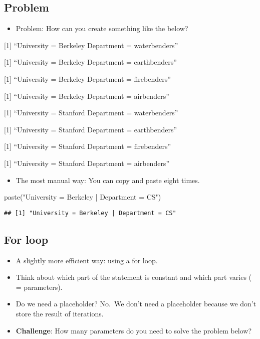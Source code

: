 \documentclass[
]{book}
\newenvironment{Shaded}{\begin{snugshade}}{\end{snugshade}}
\newcommand{\FunctionTok}[1]{\textcolor[rgb]{0.00,0.00,0.00}{#1}}
\newcommand{\NormalTok}[1]{#1}
\newcommand{\StringTok}[1]{\textcolor[rgb]{0.31,0.60,0.02}{#1}}
\providecommand{\tightlist}{%
  \setlength{\itemsep}{0pt}\setlength{\parskip}{0pt}}
\begin{document}
\hypertarget{problem}{%
\subsection{Problem}\label{problem}}

\begin{itemize}
\tightlist
\item
  Problem: How can you create something like the below?
\end{itemize}

{[}1{]} ``University = Berkeley \textbar{} Department = waterbenders''

{[}1{]} ``University = Berkeley \textbar{} Department = earthbenders''

{[}1{]} ``University = Berkeley \textbar{} Department = firebenders''

{[}1{]} ``University = Berkeley \textbar{} Department = airbenders''

{[}1{]} ``University = Stanford \textbar{} Department = waterbenders''

{[}1{]} ``University = Stanford \textbar{} Department = earthbenders''

{[}1{]} ``University = Stanford \textbar{} Department = firebenders''

{[}1{]} ``University = Stanford \textbar{} Department = airbenders''

\begin{itemize}
\tightlist
\item
  The most manual way: You can copy and paste eight times.
\end{itemize}

\begin{Shaded}
\begin{Highlighting}[]
\FunctionTok{paste}\NormalTok{(}\StringTok{"University = Berkeley | Department = CS"}\NormalTok{)}
\end{Highlighting}
\end{Shaded}

\begin{verbatim}
## [1] "University = Berkeley | Department = CS"
\end{verbatim}

\hypertarget{for-loop-1}{%
\subsection{For loop}\label{for-loop-1}}

\begin{itemize}
\item
  A slightly more efficient way: using a for loop.
\item
  Think about which part of the statement is constant and which part varies ( = parameters).\\
\item
  Do we need a placeholder? No.~We don't need a placeholder because we don't store the result of iterations.
\item
  \textbf{Challenge}: How many parameters do you need to solve the problem below?
\end{itemize}
\end{document}
